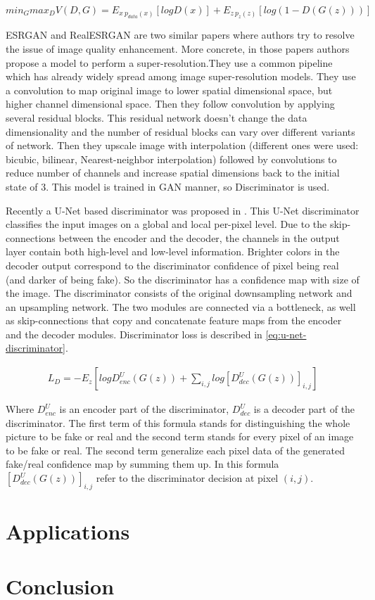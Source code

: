 \begin{equation}
    \label{eq:gan}
    min_G max_D V(D, G) = E_{x~p_{data}(x)} [log D(x)] + E_{z~p_z(z)} [log(1 - D(G(z)))]
\end{equation}

ESRGAN \cite{Wang_Yu_Wu_Gu_Liu_Dong_Qiao_Loy_2019} and RealESRGAN \cite{Wang_Xie_Dong_Shan_2021} are two similar papers where authors try to resolve the issue of image quality enhancement. More concrete, in those papers authors propose a model to perform a super-resolution.They use a common pipeline which has already widely spread among image super-resolution models. They use a convolution to map original image to lower spatial dimensional space, but higher channel dimensional space. Then they follow convolution by applying several residual blocks. This residual network doesn't change the data dimensionality and the number of residual blocks can vary over different variants of network. Then they upscale image with interpolation (different ones were used: bicubic, bilinear, Nearest-neighbor interpolation) followed by convolutions to reduce number of channels and increase spatial dimensions back to the initial state of 3. This model is trained in GAN manner, so Discriminator is used.

Recently a U-Net based discriminator was proposed in \cite{schonfeld_u-net_2021}. This U-Net discriminator classifies the input images on a global and local per-pixel level. Due to the skip-connections between the encoder and the decoder, the channels in the output layer contain both high-level and low-level information. Brighter colors in the decoder output correspond to the discriminator confidence of pixel being real (and darker of being fake). So the discriminator has a confidence map with size of the image. The discriminator consists of the original downsampling network and an upsampling network. The two modules are connected via a bottleneck, as well as skip-connections that copy and concatenate feature maps from the encoder and the decoder modules. Discriminator loss is described in \ref{eq:u-net-discriminator}.

\begin{equation}
    \label{eq:u-net-discriminator}
    \begin{split}
        L_D = -E_z[log D_{enc}^U(G(z)) + \sum_{i,j}{log [D_{dec}^U(G(z))]_{i,j}}]
    \end{split}
\end{equation}

Where $D_{enc}^U$ is an encoder part of the discriminator, $D_{dec}^U$ is a decoder part of the discriminator. The first term of this formula stands for distinguishing the whole picture to be fake or real and the second term stands for every pixel of an image to be fake or real. The second term generalize each pixel data of the generated fake/real confidence map by summing them up. In this formula $[D_{dec}^U(G(z))]_{i,j}$ refer to the discriminator decision at pixel $(i,j)$.

\chapter{Applications}

\chapter{Conclusion}
